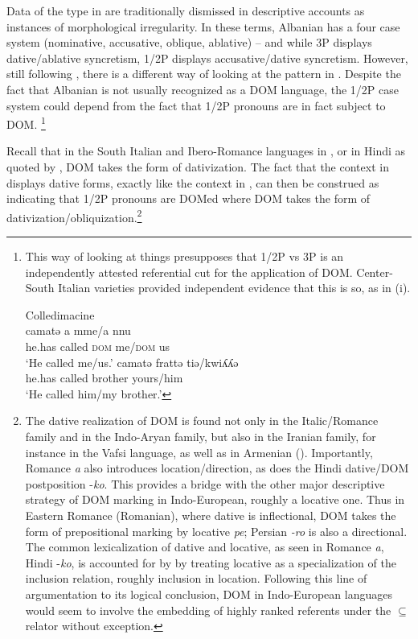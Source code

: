 \documentclass[output=paper,colorlinks,citecolor=brown,nonflat]{./langscibook}
\begin{document}
Data of the type in  are traditionally dismissed in descriptive accounts as instances of morphological irregularity. In these terms, Albanian has a four case system (nominative, accusative, oblique, ablative) – and while 3P displays dative/ablative syncretism, 1/2P displays accusative/dative syncretism. However, still following \citet{ManziniSavoia2014}, there is a different way of looking at the pattern in . Despite the fact that Albanian is not usually recognized as a DOM language, the 1/2P case system could depend from the fact that 1/2P pronouns are in fact subject to DOM.{} \footnote{This way of looking at things presupposes that 1/2P vs 3P is an independently attested referential cut for the application of DOM. Center-South Italian varieties provided independent evidence that this is so, as in (i).

\ea%
    
    Colledimacine \citep{ManziniSavoia2005}\\
    \ea
     {camatə} {a} {mme/a} {nnu}\\
        {he.has}  {called} \textsc{dom} {me/\textsc{dom}} {us}\\
    \glt ‘He called me/us.’
    \ex 
       {camatə} {frattə} {tiə/kwiʎʎə}\\
        {he.has}  called   brother yours/him\\
    \glt ‘He called him/my brother.’
    \z
\z
}

Recall that in the South Italian and Ibero-Romance languages in , or in Hindi as quoted by \citet{Torrego1998}, DOM takes the form of dativization. The fact that the context in  displays dative forms, exactly like the context in , can then be construed as indicating that 1/2P pronouns are DOMed where DOM takes the form of dativization/obliquization.\footnote{{ The dative realization of DOM is found not only in the Italic/Romance family and in the Indo-Aryan family, but also in the Iranian family, for instance in the Vafsi language, as well as in Armenian (\citealt{ManziniFranco2016}). Importantly, Romance \textit{a} also introduces location/direction, as does the Hindi dative/DOM postposition -\textit{ko}.} This provides a bridge with the other major descriptive strategy of DOM marking in Indo-European, roughly a locative one. Thus in Eastern Romance (Romanian), where dative is inflectional, DOM takes the form of prepositional marking by locative \textit{pe}; Persian \textit{{}-ro} is also a directional.  The common lexicalization of dative and locative, as seen in Romance \textit{a}, Hindi -\textit{ko}, is accounted for by \citet{FrancoManzini2017Ins} by treating locative as a specialization of the inclusion relation, roughly inclusion in location. Following this line of argumentation to its logical conclusion, DOM in Indo-European languages would seem to involve the embedding of highly ranked referents under the \textrm{${\subseteq}$} relator without exception.}  
\end{document}
